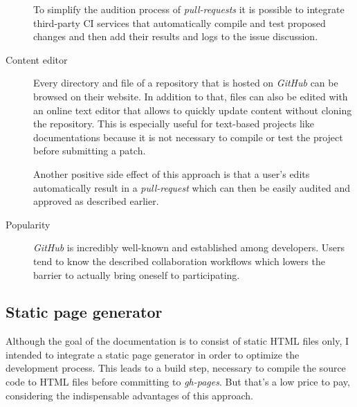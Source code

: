 \begin{description}
	To simplify the audition process of \textit{pull-requests} it is possible to integrate third-party \ac{CI} services that automatically compile and test proposed changes and then add their results and logs to the issue discussion.

	\item[Content editor]\hfill

	Every directory and file of a repository that is hosted on \textit{GitHub} can be browsed on their website. In addition to that, files can also be edited with an online text editor that allows to quickly update content without cloning the repository. This is especially useful for text-based projects like documentations because it is not necessary to compile or test the project before submitting a patch.

	Another positive side effect of this approach is that a user's edits automatically result in a \textit{pull-request} which can then be easily audited and approved as described earlier.

	\item[Popularity]\hfill

	\textit{GitHub} is incredibly well-known and established among developers. Users tend to know the described collaboration workflows which lowers the barrier to actually bring oneself to participating.

\end{description}

\subsection{Static page generator}

Although the goal of the documentation is to consist of static \ac{HTML} files only, I intended to integrate a static page generator in order to optimize the development process. This leads to a build step, necessary to compile the source code to \ac{HTML} files before committing to \textit{gh-pages}. But that's a low price to pay, considering the indispensable advantages of this approach.

